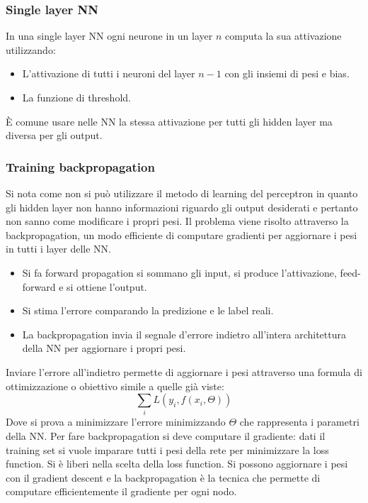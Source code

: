 		\subsubsection{Single layer NN}
		In una single layer NN ogni neurone in un layer $n$ computa la sua attivazione utilizzando:
		\begin{itemize}
			\item L'attivazione di tutti i neuroni del layer $n-1$ con gli insiemi di pesi e bias.
			\item La funzione di threshold.
		\end{itemize}
		\`E comune usare nelle NN la stessa attivazione per tutti gli hidden layer ma diversa per gli output.

		\subsubsection{Training backpropagation}
		Si nota come non si pu\`o utilizzare il metodo di learning del perceptron in quanto gli hidden layer non hanno informazioni riguardo gli output desiderati e pertanto non sanno come modificare i propri pesi.
		Il problema viene risolto attraverso la backpropagation, un modo efficiente di computare gradienti per aggiornare i pesi in tutti i layer delle NN.
		\begin{itemize}
			\item Si fa forward propagation si sommano gli input, si produce l'attivazione, feed-forward e si ottiene l'output.
			\item Si stima l'errore comparando la predizione e le label reali.
			\item La backpropagation invia il segnale d'errore indietro all'intera architettura della NN per aggiornare i propri pesi.
		\end{itemize}
		Inviare l'errore all'indietro permette di aggiornare i pesi attraverso una formula di ottimizzazione o obiettivo simile a quelle gi\`a viste:
		$$\sum_i L(y_i, f(x_i, \Theta))$$
		Dove si prova a minimizzare l'errore minimizzando $\Theta$ che rappresenta i parametri della NN.
		Per fare backpropagation si deve computare il gradiente: dati il training set si vuole imparare tutti i pesi della rete per minimizzare la loss function.
		Si \`e liberi nella scelta della loss function.
		Si possono aggiornare i pesi con il gradient descent e la backpropagation \`e la tecnica che permette di computare efficientemente il gradiente per ogni nodo.


